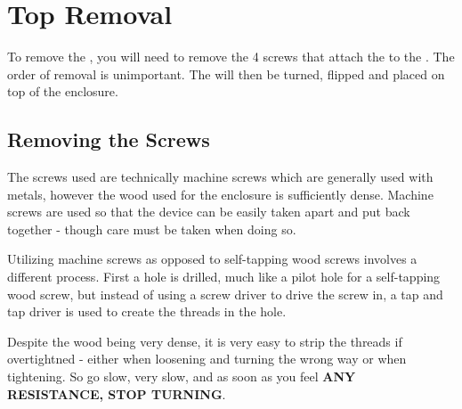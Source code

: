 \section{Top Removal} \label{Top Removal}

To remove the , you will need to remove the \num{4} screws that attach
the  to the .  The order of removal is unimportant.  The 
will then be turned, flipped and placed on top of the enclosure.


\subsection{Removing the Screws} \label{Removing the Screws}

The screws used are technically machine screws which are generally used with
metals, however the wood used for the enclosure is sufficiently dense. Machine
screws are used so that the device can be easily taken apart and put back
together - though care must be taken when doing so.

\par\medskip

Utilizing machine screws as opposed to self-tapping wood screws involves a
different process.  First a hole is drilled, much like a pilot hole for a
self-tapping wood screw, but instead of using a screw driver to drive the screw
in, a tap and tap driver is used to create the threads in the hole.

\par\medskip

Despite the wood being very dense, it is very easy to strip the threads if
overtightned - either when loosening and turning the wrong way or when
tightening.  So go slow, very slow, and as soon as you feel
\textbf{ANY RESISTANCE, STOP TURNING}.

